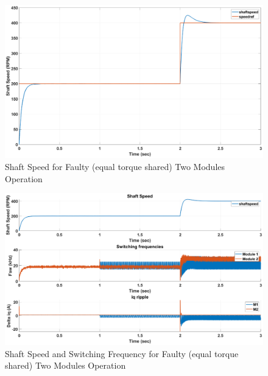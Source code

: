 \documentclass{article}
\begin{document}
\begin{figure}[h!]
\centering
\includegraphics[scale=0.35]{SimulationResults/two_modules/faulty_torqueshared/speed.eps}
\caption{Shaft Speed for Faulty (equal torque shared) Two Modules Operation}
\label{fig:ShaftSpeedTwoModulesFaultyEqualTorque}
\end{figure}

\begin{figure}[h!]
\centering
\includegraphics[scale=0.35]{SimulationResults/two_modules/faulty_torqueshared/speed_fsw_iqripple.eps}
\caption{Shaft Speed and Switching Frequency for Faulty (equal torque shared) Two Modules Operation}
\label{fig:ShaftSpeedFswIqRippleTwoModulesFaultyEqualTorque}
\end{figure}
\end{document}
